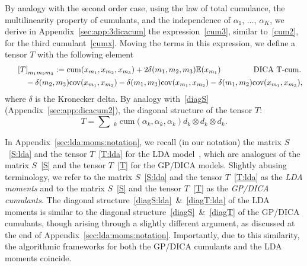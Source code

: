 \documentclass{article}
\newcommand{\sbra}[1]{\left[#1\right]}
\newcommand{\tp}{\otimes}
\newcommand{\ga}{\alpha}
\newcommand{\gd}{\delta}
\newcommand{\ebb}{\mathbb{E}}
\newcommand{\cov}{\mathrm{cov}}
\newcommand{\cum}{\mathrm{cum}}
\begin{document}
By analogy with the second order case, 
using the law of total cumulance, the multilinearity property of cumulants, and the independence of $\ga_1$, $\dots$, $\ga_K$, we derive in Appendix~\ref{sec:app:3dicacum} the expression~\eqref{cum3}, similar to~\eqref{cum2}, for the third cumulant~\eqref{cumx}. Moving the terms in this expression, we  define a tensor $T$ with the following element
\begin{align}
\phantom{\text{DICA}}& \!\!\!\! \!\!\! \sbra{T}_{m_1m_2m_3} := \cum(x_{m_1},x_{m_2},x_{m_3}) + 2\gd(m_1,m_2,m_3) \ebb(x_{m_1}) \qquad\qquad\, \text{DICA T-cum.} \label{T} \\
& - \gd(m_2,m_3) \cov(x_{m_1},x_{m_2}) - \gd(m_1,m_3) \cov(x_{m_1},x_{m_2}) - \gd(m_1,m_2) \cov(x_{m_1},x_{m_3}), \notag
\end{align}
where $\delta$ is the Kronecker delta.
By analogy with~\eqref{diagS} (Appendix~\ref{sec:app:dicacum2}), the diagonal structure of the tensor $T$:
\begin{equation} 
\label{diagT}
T = \sum\mathop{}_{k} \cum(\ga_k,\ga_k,\ga_k)d_k\tp d_k \tp d_k.
\end{equation}


In Appendix~\ref{sec:lda:moms:notation}, we recall (in our notation) the matrix $S$~\eqref{S:lda} and the tensor $T$~\eqref{T:lda} for the LDA model~\cite{AnaEtAl2012}, which are analogues of the matrix $S$~\eqref{S} and the tensor $T$~\eqref{T} for the GP/DICA models. Slightly abusing terminology, we refer to the matrix $S$~\eqref{S:lda} and the tensor $T$~\eqref{T:lda} as the {\it LDA moments} and to the matrix $S$~\eqref{S} and the tensor $T$~\eqref{T} as the {\it GP/DICA cumulants}. The diagonal structure~\eqref{diagS:lda}~\&~\eqref{diagT:lda} of the LDA moments is similar to the diagonal structure~\eqref{diagS}~\&~\eqref{diagT} of the GP/DICA cumulants, though arising through a slightly different argument, as discussed at the end of Appendix~\ref{sec:lda:moms:notation}. Importantly, due to this similarity, the algorithmic frameworks for both the GP/DICA cumulants and the LDA moments coincide. 
\end{document}
